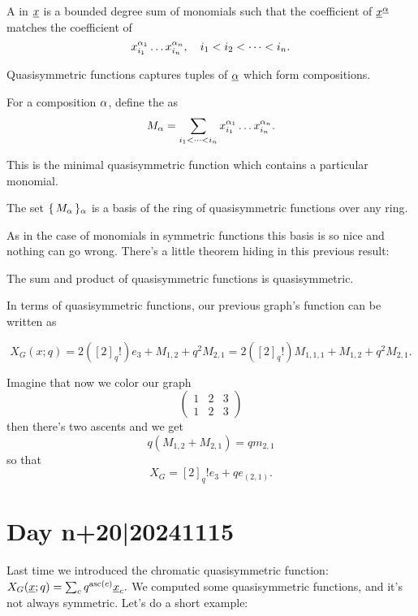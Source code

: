 \documentclass[12pt]{memoir}
\begin{document}
\begin{Def}
    A  in $\underline x$ is a bounded degree sum of monomials such that the coefficient of $\underline x^{\underline {\alpha}}$ matches the coefficient of 
    $$x_{i_1}^{\alpha_1}\dots x_{i_n}^{\alpha_n},\quad i_1<i_2<\dots<i_n.$$
\end{Def}

Quasisymmetric functions captures tuples of $\underline{\alpha}$ which form compositions. 

\begin{Def}
    For a composition $\alpha$, define the  as 
    $$M_{\alpha}=\sum_{i_1<\dots<i_n}x_{i_1}^{\alpha_1}\dots x_{i_n}^{\alpha_n}.$$
\end{Def}

This is the minimal quasisymmetric function which contains a particular monomial. 

\begin{Prop}
    The set $\{\,M_\alpha\,\}_\alpha$ is a basis of the ring of quasisymmetric functions over any ring.
\end{Prop}

As in the case of monomials in symmetric functions this basis is so nice and nothing can go wrong. There's a little theorem hiding in this previous result:

\begin{Th}
    The sum and product of quasisymmetric functions is quasisymmetric.
\end{Th}

In terms of quasisymmetric functions, our previous graph's function can be written as 

$$X_G(x;q)=2([2]_q!)e_3+M_{1,2}+q^2M_{2,1}=2([2]_q!)M_{1,1,1}+M_{1,2}+q^2M_{2,1}.$$

\begin{Ex}
    Imagine that now we color our graph 
    $$\begin{pmatrix}
        1&2&3\\
        1&2&3
    \end{pmatrix}$$
    then there's two ascents and we get 
    $$q(M_{1,2}+M_{2,1})=qm_{2,1}$$
    so that 
    $$X_G=[2]_q!e_3+qe_{(2,1)}.$$
\end{Ex}

\section{Day n+20|20241115}

Last time we introduced the chromatic quasisymmetric function: $X_G(\underline x;q)=\sum_{c}q^{\operatorname{asc}(c)}\underline x_{c}.$ We computed some quasisymmetric functions, and it's not always symmetric. Let's do a short example:
\end{document}

